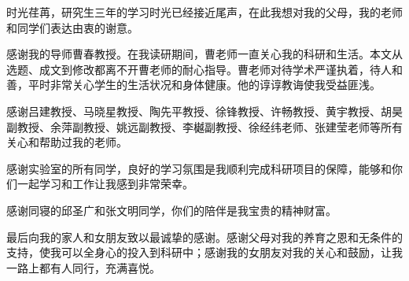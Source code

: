 \documentclass[macfonts,master]{njuthesis}
\begin{document}
\begin{acknowledgement}
  时光荏苒，研究生三年的学习时光已经接近尾声，在此我想对我的父母，我的老师和同学们表达由衷的谢意。

  感谢我的导师曹春教授。在我读研期间，曹老师一直关心我的科研和生活。本文从选题、成文到修改都离不开曹老师的耐心指导。曹老师对待学术严谨执着，待人和善，平时非常关心学生的生活状况和身体健康。他的谆谆教诲使我受益匪浅。

  感谢吕建教授、马晓星教授、陶先平教授、徐锋教授、许畅教授、黄宇教授、胡昊副教授、余萍副教授、姚远副教授、李樾副教授、徐经纬老师、张建莹老师等所有关心和帮助过我的老师。

  感谢实验室的所有同学，良好的学习氛围是我顺利完成科研项目的保障，能够和你们一起学习和工作让我感到非常荣幸。

  感谢同寝的邱圣广和张文明同学，你们的陪伴是我宝贵的精神财富。

  最后向我的家人和女朋友致以最诚挚的感谢。感谢父母对我的养育之恩和无条件的支持，使我可以全身心的投入到科研中；感谢我的女朋友对我的关心和鼓励，让我一路上都有人同行，充满喜悦。
\end{acknowledgement}

\appendix



\nocite{*}

%
%

\end{document}
